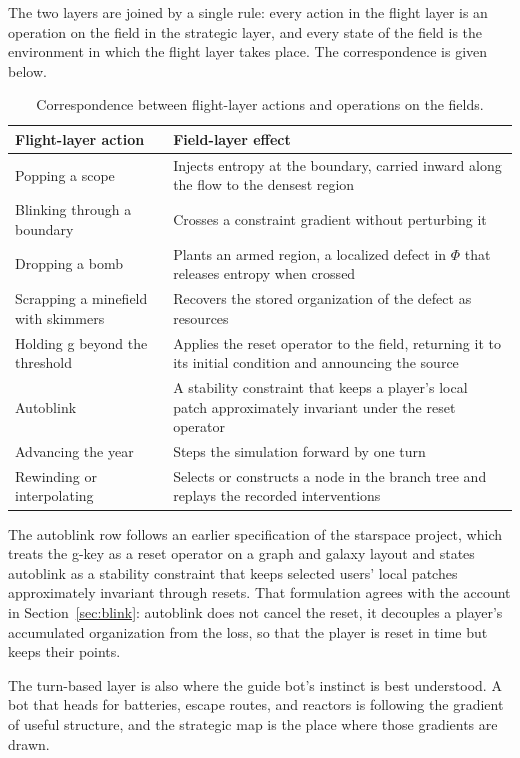 \documentclass[11pt]{article}
\begin{document}
The two layers are joined by a single rule: every action in the flight layer is an operation on the field in the strategic layer, and every state of the field is the environment in which the flight layer takes place. The correspondence is given below.

\begin{table}[h]
\centering
\begin{tabular}{@{}p{3.6cm}p{8.8cm}@{}}
\toprule
Flight-layer action & Field-layer effect \\
\midrule
Popping a scope & Injects entropy at the boundary, carried inward along the flow to the densest region \\
Blinking through a boundary & Crosses a constraint gradient without perturbing it \\
Dropping a bomb & Plants an armed region, a localized defect in $\Phi$ that releases entropy when crossed \\
Scrapping a minefield with skimmers & Recovers the stored organization of the defect as resources \\
Holding g beyond the threshold & Applies the reset operator to the field, returning it to its initial condition and announcing the source \\
Autoblink & A stability constraint that keeps a player's local patch approximately invariant under the reset operator \\
Advancing the year & Steps the simulation forward by one turn \\
Rewinding or interpolating & Selects or constructs a node in the branch tree and replays the recorded interventions \\
\bottomrule
\end{tabular}
\caption{Correspondence between flight-layer actions and operations on the fields.}
\end{table}

The autoblink row follows an earlier specification of the starspace project, which treats the g-key as a reset operator on a graph and galaxy layout and states autoblink as a stability constraint that keeps selected users' local patches approximately invariant through resets. That formulation agrees with the account in Section~\ref{sec:blink}: autoblink does not cancel the reset, it decouples a player's accumulated organization from the loss, so that the player is reset in time but keeps their points.

The turn-based layer is also where the guide bot's instinct is best understood. A bot that heads for batteries, escape routes, and reactors is following the gradient of useful structure, and the strategic map is the place where those gradients are drawn.
\end{document}
